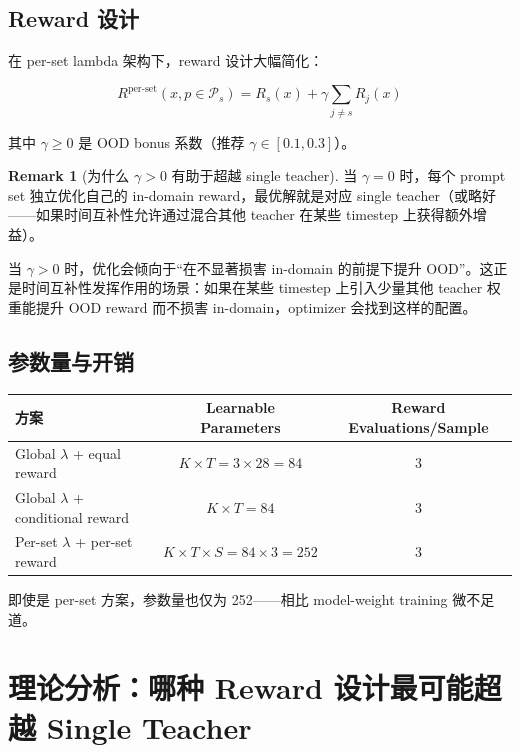\documentclass[11pt,a4paper]{article}
\newcommand{\reward}{R}
\theoremstyle{definition}
\newtheorem{remark}{Remark}
\begin{document}
\subsection{Reward 设计}

在 per-set lambda 架构下，reward 设计大幅简化：

\begin{equation}
\reward^{\mathrm{per\text{-}set}}(x, p \in \mathcal{P}_s) = R_s(x) + \gamma \sum_{j \neq s} R_j(x)
\label{eq:per_set_reward}
\end{equation}

其中 $\gamma \geq 0$ 是 OOD bonus 系数（推荐 $\gamma \in [0.1, 0.3]$）。

\begin{remark}[为什么 $\gamma > 0$ 有助于超越 single teacher]
当 $\gamma = 0$ 时，每个 prompt set 独立优化自己的 in-domain reward，最优解就是对应 single teacher（或略好——如果时间互补性允许通过混合其他 teacher 在某些 timestep 上获得额外增益）。

当 $\gamma > 0$ 时，优化会倾向于``在不显著损害 in-domain 的前提下提升 OOD''。这正是时间互补性发挥作用的场景：如果在某些 timestep 上引入少量其他 teacher 权重能提升 OOD reward 而不损害 in-domain，optimizer 会找到这样的配置。
\end{remark}

\subsection{参数量与开销}

\begin{center}
\begin{tabular}{@{}lcc@{}}
\toprule
\textbf{方案} & \textbf{Learnable Parameters} & \textbf{Reward Evaluations/Sample} \\
\midrule
Global $\lambda$ + equal reward & $K \times T = 3 \times 28 = 84$ & 3 \\
Global $\lambda$ + conditional reward & $K \times T = 84$ & 3 \\
Per-set $\lambda$ + per-set reward & $K \times T \times S = 84 \times 3 = 252$ & 3 \\
\bottomrule
\end{tabular}
\end{center}

即使是 per-set 方案，参数量也仅为 252——相比 model-weight training 微不足道。

\section{理论分析：哪种 Reward 设计最可能超越 Single Teacher}
\label{sec:theory}
\end{document}
